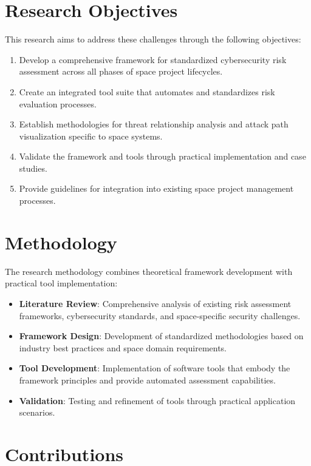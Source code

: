 \documentclass[binding=0.6cm]{sapthesis}
\begin{document}
\section{Research Objectives}

This research aims to address these challenges through the following objectives:

\begin{enumerate}
    \item Develop a comprehensive framework for standardized cybersecurity risk assessment across all phases of space project lifecycles.
    \item Create an integrated tool suite that automates and standardizes risk evaluation processes.
    \item Establish methodologies for threat relationship analysis and attack path visualization specific to space systems.
    \item Validate the framework and tools through practical implementation and case studies.
    \item Provide guidelines for integration into existing space project management processes.
\end{enumerate}

\section{Methodology}

The research methodology combines theoretical framework development with practical tool implementation:

\begin{itemize}
    \item \textbf{Literature Review}: Comprehensive analysis of existing risk assessment frameworks, cybersecurity standards, and space-specific security challenges.
    \item \textbf{Framework Design}: Development of standardized methodologies based on industry best practices and space domain requirements.
    \item \textbf{Tool Development}: Implementation of software tools that embody the framework principles and provide automated assessment capabilities.
    \item \textbf{Validation}: Testing and refinement of tools through practical application scenarios.
\end{itemize}

\section{Contributions}
\end{document}

